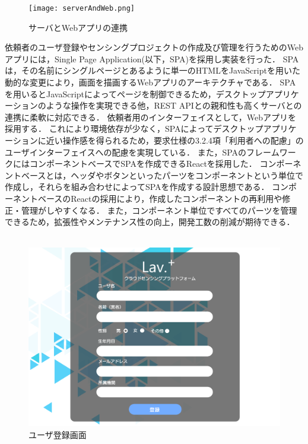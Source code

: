 \begin{figure}[H]
  \centering
  \texttt{[image: serverAndWeb.png]}
  \caption{サーバとWebアプリの連携}
  \label{kanri}
\end{figure}

依頼者のユーザ登録やセンシングプロジェクトの作成及び管理を行うためのWebアプリには，Single Page Application(以下，SPA)を採用し実装を行った．
SPAは，その名前にシングルページとあるように単一のHTMLをJavaScriptを用いた動的な変更により，画面を描画するWebアプリのアーキテクチャである．
SPAを用いるとJavaScriptによってページを制御できるため，デスクトップアプリケーションのような操作を実現できる他，REST APIとの親和性も高くサーバとの連携に柔軟に対応できる．
依頼者用のインターフェイスとして，Webアプリを採用する．
これにより環境依存が少なく，SPAによってデスクトップアプリケーションに近い操作感を得られるため，要求仕様の3.2.4項「利用者への配慮」のユーザインターフェイスへの配慮を実現している．
また，SPAのフレームワークにはコンポーネントベースでSPAを作成できるReactを採用した．
コンポーネントベースとは，ヘッダやボタンといったパーツをコンポーネントという単位で作成し，それらを組み合わせによってSPAを作成する設計思想である．
コンポーネントベースのReactの採用により，作成したコンポーネントの再利用や修正・管理がしやすくなる．
また，コンポーネント単位ですべてのパーツを管理できるため，拡張性やメンテナンス性の向上，開発工数の削減が期待できる．
　
\begin{figure}[H]
  \centering
  \includegraphics[width=120mm]{Signup.png}
  \caption{ユーザ登録画面}
  \label{baseSetting}
\end{figure}

